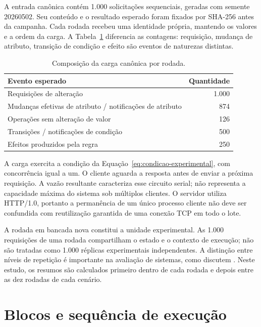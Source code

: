 A entrada canônica contém 1.000 solicitações sequenciais, geradas com semente 20260502. Seu conteúdo e o resultado esperado foram fixados por SHA-256 antes da campanha. Cada rodada recebeu uma identidade própria, mantendo os valores e a ordem da carga. A Tabela~\ref{tab:carga-canonica} diferencia as contagens: requisição, mudança de atributo, transição de condição e efeito são eventos de naturezas distintas.

\begin{table}[htbp]
\centering\small
\caption{Composição da carga canônica por rodada.}
\label{tab:carga-canonica}
\begin{tabularx}{\linewidth}{@{}Xr@{}}
\toprule
Evento esperado & Quantidade \\
\midrule
Requisições de alteração & 1.000 \\
Mudanças efetivas de atributo / notificações de atributo & 874 \\
Operações sem alteração de valor & 126 \\
Transições / notificações de condição & 500 \\
Efeitos produzidos pela regra & 250 \\
\bottomrule
\end{tabularx}
\end{table}

A carga exercita a condição da Equação~\ref{eq:condicao-experimental}, com concorrência igual a um. O cliente aguarda a resposta antes de enviar a próxima requisição. A vazão resultante caracteriza esse circuito serial; não representa a capacidade máxima do sistema sob múltiplos clientes. O servidor utiliza HTTP/1.0, portanto a permanência de um único processo cliente não deve ser confundida com reutilização garantida de uma conexão TCP em todo o lote.

A rodada em bancada nova constitui a unidade experimental. As 1.000 requisições de uma rodada compartilham o estado e o contexto de execução; não são tratadas como 1.000 réplicas experimentais independentes. A distinção entre níveis de repetição é importante na avaliação de sistemas, como discutem . Neste estudo, os resumos são calculados primeiro dentro de cada rodada e depois entre as dez rodadas de cada cenário.

\section{Blocos e sequência de execução}

